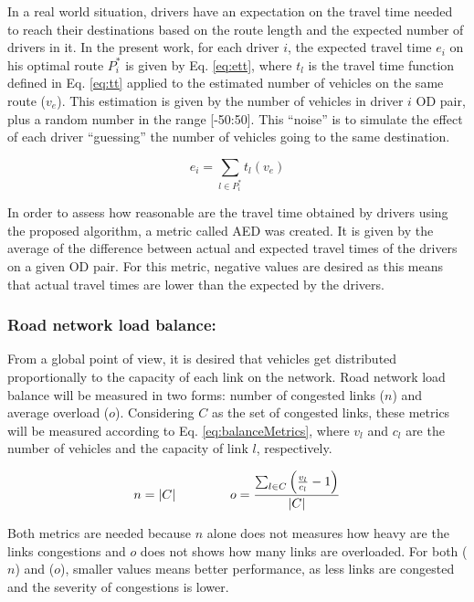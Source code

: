 \documentclass[12pt]{llncs}
\newcommand{\optRoute}[1]{\ensuremath{P_#1^*}}	%
\newcommand{\travTime}{\ensuremath{t_l}} 	%
\newcommand{\linkCap}{\ensuremath{c_l}}		%
\newcommand{\veh}{\ensuremath{v}}		%
\newcommand{\ett}[1]{\ensuremath{e_#1}}		%
\newcommand{\expVeh}{\ensuremath{v_e}}		%
\newcommand{\congRoads}{\ensuremath{C}}		%
\newcommand{\numCong}{\ensuremath{n}}		%
\newcommand{\overLoadFactor}{\ensuremath{o}}	%
\begin{document}
In a real world situation, drivers have an expectation on the travel time needed to reach their destinations based on the route length and the expected number of drivers in it. In the present work, for each driver $i$, the expected travel time $\ett{i}$ on his optimal route \optRoute{i} is given by Eq. \eqref{eq:ett}, where $\travTime$ is the travel time function defined in Eq. \eqref{eq:tt} applied to the estimated number of vehicles on the same route ($\expVeh$). This estimation is given by the number of vehicles in driver $i$ OD pair, plus a random number in the range [-50:50]. This ``noise'' is to simulate the effect of each driver ``guessing'' the number of vehicles going to the same destination.

\begin{equation}
\label{eq:ett}
\ett{i} = \sum_{l \in \optRoute{i}}\travTime(\expVeh)
\end{equation}

In order to assess how reasonable are the travel time obtained by drivers using the proposed algorithm, a metric called AED was created. It is given by the average of the difference between actual and expected travel times of the drivers on a given OD pair. For this metric, negative values are desired as this means that actual travel times are lower than the expected by the drivers.

\subsubsection{Road network load balance:}

From a global point of view, it is desired that vehicles get distributed proportionally to the capacity of each link on the network. Road network load balance will be measured in two forms: number of congested links ($n$) and average overload ($o$). Considering $C$ as the set of congested links, these metrics will be measured according to Eq. \eqref{eq:balanceMetrics}, where $\veh_l$ and $\linkCap$ are the number of vehicles and the capacity of link $l$, respectively. 

\begin{equation}
\label{eq:balanceMetrics}
\numCong = |\congRoads| \hspace{1.5cm}  \overLoadFactor = \frac{ \sum_{l \in \congRoads} \left(\frac{\veh_l}{\linkCap} -1 \right)}{|C|}
\end{equation}

Both metrics are needed because $n$ alone does not measures how heavy are the links congestions and $o$ does not shows how many links are overloaded. For both ($n$) and ($o$), smaller values means better performance, as less links are congested and the severity of congestions is lower.
\end{document}

